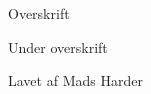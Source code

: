\documentclass[12pt, a4paper]{article}
\begin{document}
\begin{titlepage}
	\begin{center}
		{\huge Overskrift}\\

		\vspace{0.5cm}

		{\large Under overskrift}\\

		\vspace{0.2cm}

		Lavet af Mads Harder

		\vspace{4cm}

	\end{center}
\end{titlepage}
\newpage

\thispagestyle{empty}
\renewcommand{\contentsname}{Indholdsfortegnelse}
\tableofcontents

\newpage
\setcounter{page}{1}
\end{document}
